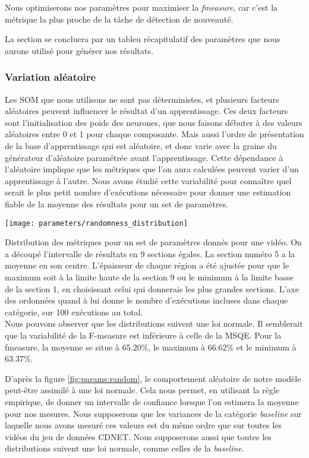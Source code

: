 	Nous optimiserons nos paramètres pour maximiser la \textit{fmeasure}, car c'est la métrique la plus proche de la tâche de détection de nouveauté.
	
	La section se concluera par un tableu récapitulatif des paramètres que nous aurons utilisé pour générer nos résultats.

	\subsubsection{Variation aléatoire}

	Les SOM que nous utilisons ne sont pas déterministes, et plusieurs facteurs aléatoires peuvent influencer le résultat d'un apprentissage. Ces deux facteurs sont l'initialisation des poids des neurones, que nous faisons débuter à des valeurs aléatoires entre 0 et 1 pour chaque composante. Mais aussi l'ordre de présentation de la base d'apprentissage qui est aléatoire, et donc varie avec la graine du générateur d'aléatoire paramétrée avant l'apprentissage. Cette dépendance à l'aléatoire implique que les métriques que l'on aura calculées peuvent varier d'un apprentissage à l'autre. Nous avons étudié cette variabilité pour connaître quel serait le plus petit nombre d'exécutions nécessaire pour donner une estimation fiable de la moyenne des résultats pour un set de paramètres. 

	\begin{figureth}
		\texttt{[image: parameters/randomness\_distribution]}
		\caption[Effet de l'aléatoire sur les métriques]{Distribution des métriques pour un set de paramètres donnés pour une vidéo. On a découpé l'intervalle de résultats en 9 sections égales. La section numéro 5 a la moyenne en son centre. L'épaisseur de chaque région a été ajustée pour que le maximum soit à la limite haute de la section 9 ou le minimum à la limite basse de la section 1, en choisissant celui qui donnerais les plus grandes sections. L'axe des ordonnées quand à lui donne le nombre d'exécutions incluses dans chaque catégorie, sur 100 exécutions au total.\\
		
		Nous pouvons observer que les distributions suivent une loi normale. Il semblerait que la variabilité de la F-measure est inférieure à celle de la MSQE. Pour la fmeasure, la moyenne se situe à 65.20\%, le maximum à 66.62\% et le minimum à 63.37\%.}\label{fig:params:random}
	\end{figureth}

	D'après la figure \ref{fig:params:random}, le comportement aléatoire de notre modèle peut-être assimilé à une loi normale. Cela nous permet, en utilisant la règle empirique, de donner un intervalle de confiance lorsque l'on estimera la moyenne pour nos mesures. Nous supposerons que les variances de la catégorie \textit{baseline} sur laquelle nous avons mesuré ces valeurs est du même ordre que sur toutes les vidéos du jeu de données CDNET. Nous supposerons aussi que toutes les distributions suivent une loi normale, comme celles de la \textit{baseline}.

